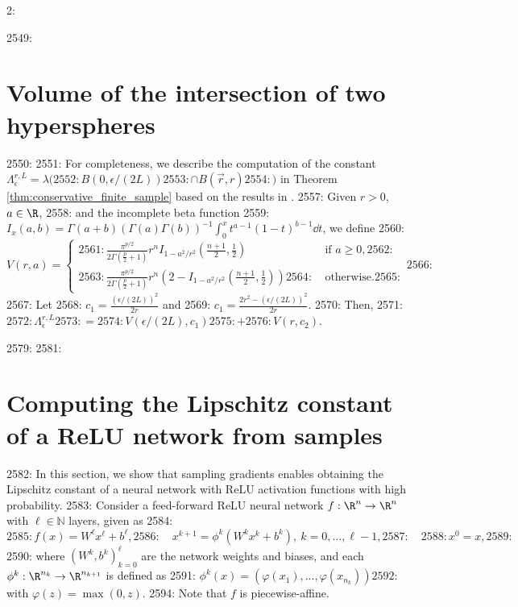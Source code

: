 2: \documentclass[12pt]{l4dc2022} %
\begin{document}
2549: \section{Volume of the intersection of two hyperspheres}
2550: \label{appendix:spherical_caps}\label{apdx:intersection_spherical_cap}
2551: For completeness, we describe the computation of the constant $\Lambda_{\epsilon}^{r,L}=\lambda\big(
2552: B(0,\epsilon/(2L)) 
2553: \cap B(\vec{r},r)
2554: \big)$ in Theorem \ref{thm:conservative_finite_sample} based on the results in \citep{Li2011,Petitjean2013,MattStackExchange2013}. 
2557: Given $r>0$, $a\in\R$, 
2558: and the incomplete beta function 
2559: $I_x(a,b)=\Gamma(a+b)(\Gamma(a)\Gamma(b))^{-1}\int_0^xt^{a-1}(1-t)^{b-1}\dd t$, we define
2560: $$V(r,a)=\begin{cases}
2561: \frac{\pi^{p/2}}{2\Gamma(\frac{p}{2}+1)}r^nI_{1-a^2/r^2}\left(\frac{n+1}{2},\frac{1}{2}\right)\ &\text{if }a\geq 0,
2562: \\
2563: \frac{\pi^{p/2}}{2\Gamma(\frac{p}{2}+1)}r^n(2-I_{1-a^2/r^2}\left(\frac{n+1}{2},\frac{1}{2}\right))
2564: \ &\text{otherwise.}
2565: \end{cases}
2566: $$
2567: Let 
2568: $c_1=\frac{(\epsilon/(2L))^2}{2r}$ and 
2569: $c_1=\frac{2r^2-(\epsilon/(2L))^2}{2r}$. 
2570: Then, 
2571: $
2572: \Lambda_{\epsilon}^{r,L}
2573: =
2574: V(\epsilon/(2L),c_1) 
2575: +
2576: V(r,c_2)$.

2579: \label{appendix:spherical_caps}
2581: \section{Computing the Lipschitz constant of a ReLU network from samples}\label{appendix:lipschitz_relu}
2582: In this section, we show that sampling gradients enables obtaining the Lipschitz constant of a neural network with ReLU activation functions with high probability. 
2583: Consider a feed-forward ReLU neural network $f:\R^n\rightarrow\R^n$ with $\ell\in\mathbb{N}$ layers, given as 
2584: $$
2585: f(x) = W^\ell x^\ell + b^\ell,
2586: \quad x^{k+1}=\phi^k(W^kx^k+b^k), \ k=0,\dots,\ell-1,
2587: \quad 
2588: x^0 = x,
2589: $$
2590: where $(W^k,b^k)_{k=0}^\ell$ are the network weights and biases, and each $\phi^k:\R^{n_k}\rightarrow\R^{n_{k+1}}$ is defined as 
2591: $\phi^k(x)=(\varphi(x_1),\dots,\varphi(x_{n_k}))
2592: $ with $\varphi(z)=\max(0,z)$. 
2594: Note that $f$ is piecewise-affine. 
\end{document}
